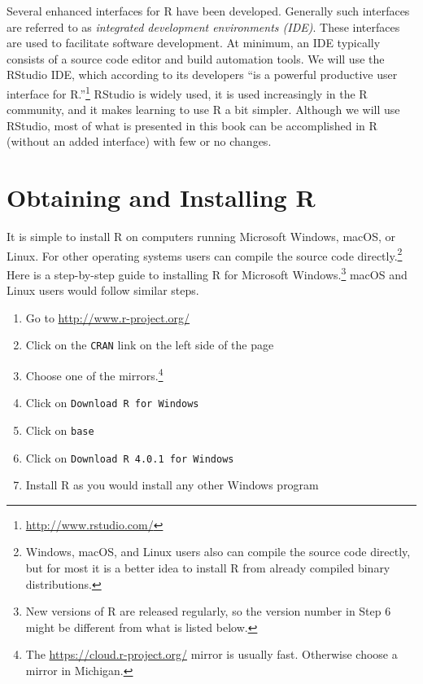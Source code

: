 \documentclass[
]{krantz}
\providecommand{\tightlist}{%
  \setlength{\itemsep}{0pt}\setlength{\parskip}{0pt}}
\begin{document}
Several enhanced interfaces for R have been developed. Generally such interfaces are referred to as \emph{integrated development environments (IDE)}. These interfaces are used to facilitate software development. At minimum, an IDE typically consists of a source code editor and build automation tools. We will use the RStudio IDE, which according to its developers ``is a powerful productive user interface for R.''\footnote{\url{http://www.rstudio.com/}} RStudio is widely used, it is used increasingly in the R community, and it makes learning to use R a bit simpler. Although we will use RStudio, most of what is presented in this book can be accomplished in R (without an added interface) with few or no changes.

\hypertarget{obtaining-and-installing-r}{%
\section{Obtaining and Installing R}\label{obtaining-and-installing-r}}

It is simple to install R on computers running Microsoft Windows, macOS, or Linux. For other operating systems users can compile the source code directly.\footnote{Windows, macOS, and Linux users also can compile the source code directly, but for most it is a better idea to install R from already compiled binary distributions.}
Here is a step-by-step guide to installing R for Microsoft Windows.\footnote{New versions of R are released regularly, so the version number in Step 6 might be different from what is listed below.} macOS and Linux users would follow similar steps.

\begin{enumerate}
\def\labelenumi{\arabic{enumi}.}
\tightlist
\item
  Go to \url{http://www.r-project.org/}
\item
  Click on the \texttt{CRAN} link on the left side of the page
\item
  Choose one of the mirrors.\footnote{The \url{https://cloud.r-project.org/} mirror is usually fast. Otherwise choose a mirror in Michigan.}
\item
  Click on \texttt{Download\ R\ for\ Windows}
\item
  Click on \texttt{base}
\item
  Click on \texttt{Download\ R\ 4.0.1\ for\ Windows}
\item
  Install R as you would install any other Windows program
\end{enumerate}
\end{document}
